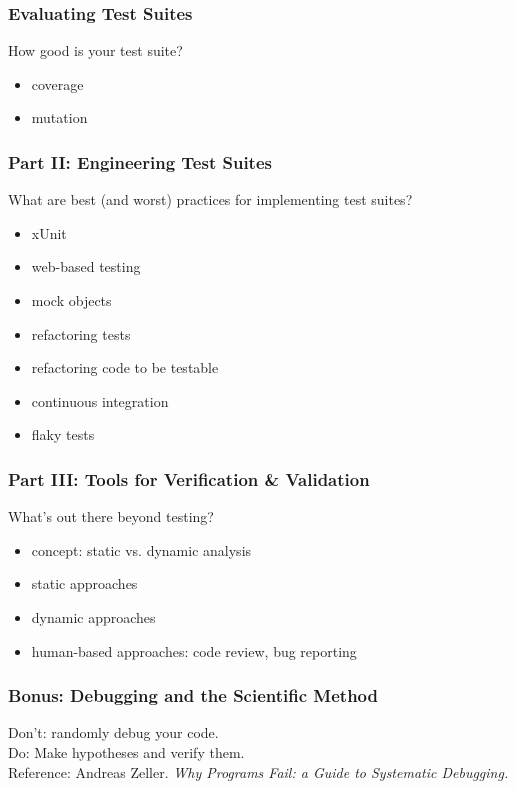 \documentclass{beamer}
\newenvironment{changemargin}[1]{%
  \begin{list}{}{%
    \setlength{\topsep}{0pt}%
    \setlength{\leftmargin}{#1}%
    \setlength{\rightmargin}{1em}
    \setlength{\listparindent}{\parindent}%
    \setlength{\itemindent}{\parindent}%
    \setlength{\parsep}{\parskip}%
  }%
  \item[]}{\end{list}}
\begin{document}
\begin{frame}
\frametitle{Evaluating Test Suites}
\begin{changemargin}{2em}
\Large
How good is your test suite?
\begin{itemize}
\item coverage
\item mutation
\end{itemize}
\end{changemargin}
\end{frame}

\begin{frame}
\frametitle{Part II: Engineering Test Suites}
\Large
\begin{changemargin}{2em}
What are best (and worst) practices for implementing test suites?
\begin{itemize}
\item xUnit
\item web-based testing
\item mock objects
\item refactoring tests
\item refactoring code to be testable
\item continuous integration
\item flaky tests
\end{itemize}
\end{changemargin}
\end{frame}

\begin{frame}
\frametitle{Part III: Tools for Verification \& Validation}
\Large
\begin{changemargin}{2em}
What's out there beyond testing?
\begin{itemize}
\item concept: static vs. dynamic analysis
\item static approaches
\item dynamic approaches
\item human-based approaches: code review, bug reporting
\end{itemize}
\end{changemargin}
\end{frame}

\begin{frame}
\frametitle{Bonus: Debugging and the Scientific Method}
\Large
\begin{changemargin}{2em}
Don't: randomly debug your code.\\[1em]
Do: Make hypotheses and verify them.\\[2em]

Reference: Andreas Zeller. \emph{Why Programs Fail: a Guide to Systematic Debugging.}
\end{changemargin}
\end{frame}
\end{document}
